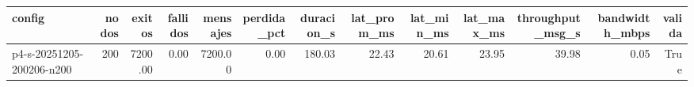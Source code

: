 \begin{tabular}{lrrrrrrrrrrrr}
\toprule
config & nodos & exitos & fallidos & mensajes & perdida_pct & duracion_s & lat_prom_ms & lat_min_ms & lat_max_ms & throughput_msg_s & bandwidth_mbps & valida \\
\midrule
p4-s-20251205-200206-n200 & 200 & 7200.00 & 0.00 & 7200.00 & 0.00 & 180.03 & 22.43 & 20.61 & 23.95 & 39.98 & 0.05 & True \\
\bottomrule
\end{tabular}
